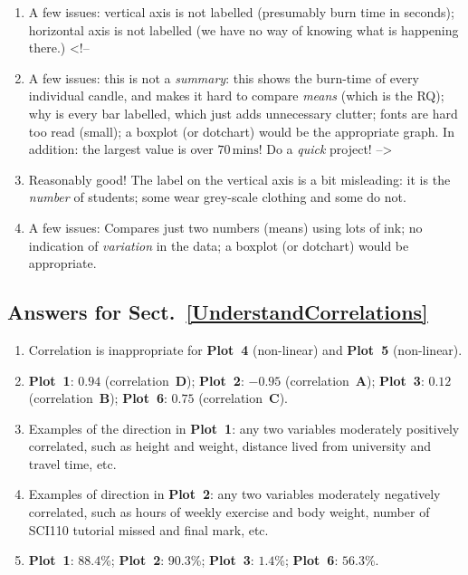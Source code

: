 \documentclass[
  11pt,
  a4paper,
  krantz2]{krantz}
\providecommand{\tightlist}{%
  \setlength{\itemsep}{0pt}\setlength{\parskip}{0pt}}
\begin{document}
\begin{footnotesize}
\begin{enumerate}
\def\labelenumi{\arabic{enumi}.}
\tightlist
\item
  A few issues: vertical axis is not labelled (presumably burn time in seconds); horizontal axis is not labelled (we have no way of knowing what is happening there.)
  \textless!--
\item
  A few issues: this is not a \emph{summary}: this shows the burn-time of every individual candle, and makes it hard to compare \emph{means} (which is the RQ); why is every bar labelled, which just adds unnecessary clutter; fonts are hard too read (small); a boxplot (or dotchart) would be the appropriate graph.
  In addition: the largest value is over \(70\,\text{mins}\)! Do a \emph{quick} project!
  --\textgreater{}
\item
  Reasonably good!
  The label on the vertical axis is a bit misleading: it is the \emph{number} of students; some wear grey-scale clothing and some do not.
\item
  A few issues: Compares just two numbers (means) using lots of ink; no indication of \emph{variation} in the data; a boxplot (or dotchart) would be appropriate.
\end{enumerate}

\subsection*{Answers for Sect.~\ref{UnderstandCorrelations}}\label{answers-for-sect.-refunderstandcorrelations}

\begin{enumerate}
\def\labelenumi{\arabic{enumi}.}
\tightlist
\item
  Correlation is inappropriate for \textbf{Plot~4} (non-linear) and \textbf{Plot~5} (non-linear).
\item
  \textbf{Plot~1}: \(0.94\) (correlation~\textbf{D});
  \textbf{Plot~2}: \(-0.95\) (correlation~\textbf{A});
  \textbf{Plot~3}: \(0.12\) (correlation~\textbf{B});
  \textbf{Plot~6}: \(0.75\) (correlation~\textbf{C}).
\item
  Examples of the direction in \textbf{Plot~1}: any two variables moderately positively correlated, such as height and weight, distance lived from university and travel time, etc.
\item
  Examples of direction in \textbf{Plot~2}: any two variables moderately negatively correlated, such as hours of weekly exercise and body weight, number of SCI110 tutorial missed and final mark, etc.
\item
  \textbf{Plot~1}: \(88.4\)\%;
  \textbf{Plot~2}: \(90.3\)\%;
  \textbf{Plot~3}: \(1.4\)\%;
  \textbf{Plot~6}: \(56.3\)\%.
\end{enumerate}


\end{footnotesize}
\end{document}
